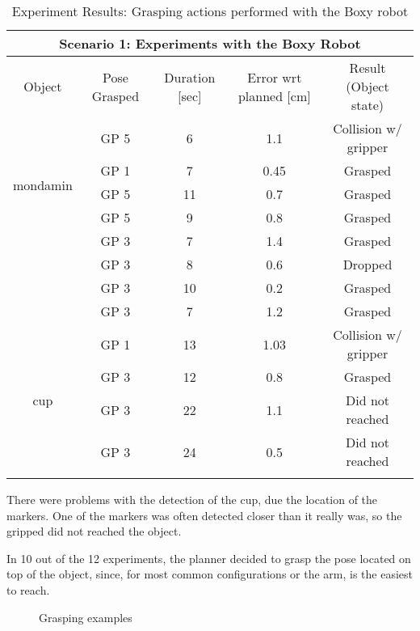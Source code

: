 {\small
\begin{center}
	\begin{longtable}[c]{ | c | c | c | c || c || }
		\hline
		\hline
		\multicolumn{5}{|c|}{Scenario 1: Experiments with the Boxy Robot} \\
		\hline
		\hline
		\endhead
		Object & Pose Grasped & Duration [sec] & Error wrt planned [cm] & Result (Object state) \\
 		\hline
		\multirow{5}{1.5cm}{mondamin}
		& GP 5 & 6 & 1.1 & Collision w/ gripper \\
		& GP 1 & 7 & 0.45 & Grasped \\
		& GP 5 & 11 & 0.7 & Grasped \\
		& GP 5 & 9 & 0.8 & Grasped \\
		\hline 
		\multirow{5}{1.5cm}{knorr tomate}
		& GP 3 & 7 & 1.4 & Grasped \\
		& GP 3 & 8 & 0.6 & Dropped \\
		& GP 3 & 10 & 0.2 & Grasped \\
		& GP 3 & 7 & 1.2 & Grasped \\		
		\hline
		\multirow{5}{1.5cm}{cup} & GP 1 & 13 & 1.03 &  Collision w/ gripper  \\
		& GP 3 & 12 & 0.8 & Grasped \\
		& GP 3 & 22 & 1.1 & Did not reached \\
		& GP 3 & 24 & 0.5 & Did not reached \\	
		\hline
\caption{Experiment Results: Grasping actions performed with the Boxy robot}
\label{table:res_robot} 
\end{longtable}
\end{center}}
\vspace{-2cm}

There were problems with the detection of the cup, due the location of the markers. One of the markers was often detected closer than it really was, so the gripped did not reached the object.

In 10 out of the 12 experiments, the planner decided to grasp the pose located on top of the object, since, for most common configurations or the arm, is the easiest to reach.
\begin{figure}[H]
	\centering
	\begin{subfigure}
		{\texttt{[image: results/grasp\_mon.jpg]}}
	\end{subfigure}
	\begin{subfigure}
		{\texttt{[image: results/grasp\_knorr.jpg]}}
	\end{subfigure}
	\begin{subfigure}
	{\texttt{[image: results/grasp\_mon2.jpg]}}
	\end{subfigure}
	\vspace{-15pt}
	\caption[Grasping]{Grasping examples}
	\vspace{-10pt}
	\label{fig:grasp}
\end{figure}


